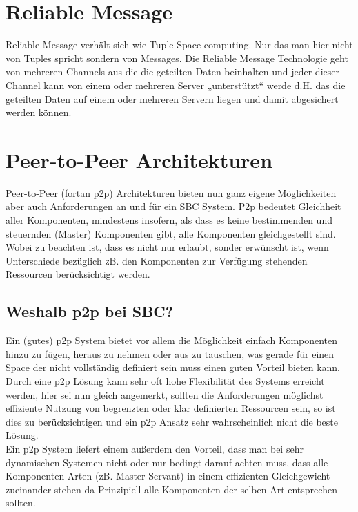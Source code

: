 \documentclass[a4paper,12pt]{scrreprt}
\begin{document}
		\section{Reliable Message}
			
			Reliable Message verhält sich wie Tuple Space computing. Nur das man hier nicht von Tuples spricht sondern von Messages.  Die Reliable Message Technologie geht von mehreren Channels aus die die geteilten Daten beinhalten und jeder dieser Channel kann von einem oder mehreren Server „unterstützt“ werde d.H.  das die geteilten Daten auf einem oder mehreren Servern liegen und damit abgesichert werden können. 
		
		\section{Peer-to-Peer Architekturen}
			
			Peer-to-Peer (fortan p2p) Architekturen bieten nun ganz eigene Möglichkeiten aber auch Anforderungen an und für ein SBC System. P2p bedeutet Gleichheit aller Komponenten, mindestens insofern, als dass es keine bestimmenden und steuernden (Master) Komponenten gibt, alle Komponenten gleichgestellt sind. Wobei zu beachten ist, dass es nicht nur erlaubt, sonder erwünscht ist, wenn Unterschiede bezüglich zB. den Komponenten zur Verfügung stehenden Ressourcen berücksichtigt werden. 
			
			\subsection{Weshalb p2p bei SBC?}
				
				Ein (gutes) p2p System bietet vor allem die Möglichkeit einfach Komponenten hinzu zu fügen, heraus zu nehmen oder aus zu tauschen, was gerade für einen Space der nicht vollständig definiert sein muss einen guten Vorteil bieten kann. Durch eine p2p Lösung kann sehr oft hohe Flexibilität des Systems erreicht werden, hier sei nun gleich angemerkt, sollten die Anforderungen möglichst effiziente Nutzung von begrenzten oder klar definierten Ressourcen sein, so ist dies zu berücksichtigen und ein p2p Ansatz sehr wahrscheinlich nicht die beste Lösung. \\
				Ein p2p System liefert einem außerdem den Vorteil, dass man bei sehr dynamischen Systemen nicht oder nur bedingt darauf achten muss, dass alle Komponenten Arten (zB. Master-Servant) in einem effizienten Gleichgewicht zueinander stehen da Prinzipiell alle Komponenten der selben Art entsprechen sollten.
				
\end{document}
